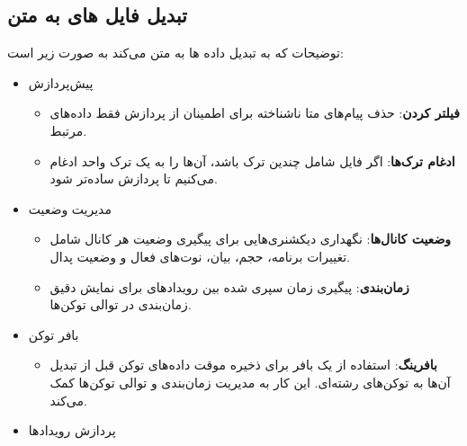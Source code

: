 \subsection{تبدیل فایل های  به متن}

توضیحات  که به تبدیل داده ها به متن می‌کند به صورت زیر است:
\begin{itemize}
      \item {پیش‌پردازش}
            \begin{itemize}
                  \item
                        \textbf{فیلتر کردن}: حذف پیام‌های متا ناشناخته برای اطمینان از پردازش
                        فقط داده‌های  مرتبط.
                  \item
                        \textbf{ادغام ترک‌ها}: اگر فایل  شامل چندین ترک باشد، آن‌ها را به یک
                        ترک واحد ادغام می‌کنیم تا پردازش ساده‌تر شود.
            \end{itemize}

      \item {مدیریت وضعیت}

            \begin{itemize}

                  \item
                        \textbf{وضعیت کانال‌ها}: نگهداری دیکشنری‌هایی برای پیگیری وضعیت هر کانال
                         شامل تغییرات برنامه، حجم، بیان، نوت‌های فعال و وضعیت پدال.
                  \item
                        \textbf{زمان‌بندی}: پیگیری زمان سپری شده بین رویدادهای  برای نمایش
                        دقیق زمان‌بندی در توالی توکن‌ها.
            \end{itemize}

      \item {بافر  توکن}

            \begin{itemize}

                  \item
                        \textbf{بافرینگ}: استفاده از یک بافر برای ذخیره موقت داده‌های توکن قبل
                        از تبدیل آن‌ها به توکن‌های رشته‌ای. این کار به مدیریت زمان‌بندی و توالی
                        توکن‌ها کمک می‌کند.
            \end{itemize}

      \item {پردازش رویدادها}

            \begin{itemize}


\end{itemize}
\end{itemize}
